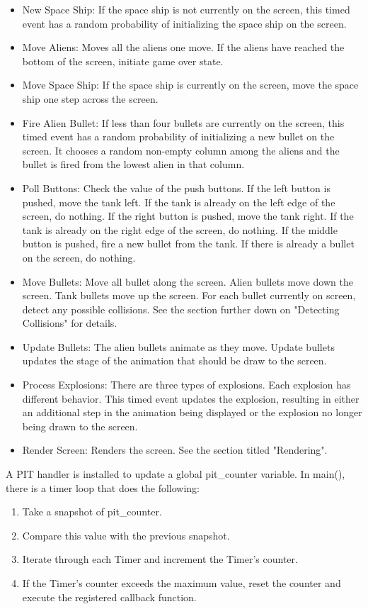 \documentclass[11pt,letter,oneside]{report}
\begin{document}
\begin{itemize}
\item New Space Ship:  If the space ship is not currently on the screen, this timed event has a random probability of initializing the space ship on the screen.
\item Move Aliens:  Moves all the aliens one move.  If the aliens have reached the bottom of the screen, initiate game over state.
\item Move Space Ship:  If the space ship is currently on the screen, move the space ship one step across the screen.
\item Fire Alien Bullet:  If less than four bullets are currently on the screen, this timed event has a random probability of initializing a new bullet on the screen.  It      chooses a random non-empty column among the aliens and the bullet is fired from the lowest alien in that column.
\item Poll Buttons:  Check the value of the push buttons.  If the left button is pushed, move the tank left.  If the tank is already on the left edge of the screen, do nothing.  If the right button is pushed, move the tank right.  If the tank is already on the right edge of the screen, do nothing.  If the middle button is pushed, fire a new bullet from the tank.  If there is already a bullet on the screen, do nothing.
\item Move Bullets:  Move all bullet along the screen.  Alien bullets move down the screen.  Tank bullets move up the screen.  For each bullet currently on screen, detect any possible collisions.  See the section further down on "Detecting Collisions" for details.
\item Update Bullets:  The alien bullets animate as they move.  Update bullets updates the stage of the animation that should be draw to the screen.
\item Process Explosions:  There are three types of explosions.  Each explosion has different behavior.  This timed event updates the explosion, resulting in either an additional step in the animation being displayed or the explosion no longer being drawn to the screen.
\item Render Screen:  Renders the screen.  See the section titled "Rendering".
\end{itemize}

A PIT handler is installed to update a global pit\_counter variable.  In main(), there is a timer loop that does the following:
\begin{enumerate}
\item{} Take a snapshot of pit\_counter.  
\item{} Compare this value with the previous snapshot.
\item{} Iterate through each Timer and increment the Timer's counter.
\item{} If the Timer's counter exceeds the maximum value, reset the counter and execute the registered callback function.
\end{enumerate}
\end{document}
